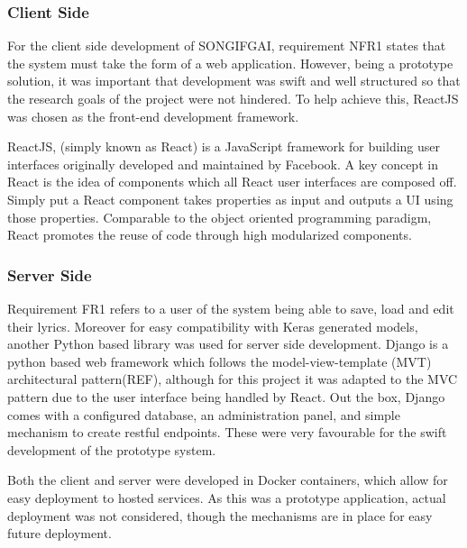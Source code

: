 \subsubsection{Client Side}
For the client side development of SONGIFGAI, requirement NFR1 states that the system must take the form of a web application. However, being a prototype solution, it was important that development was swift and well structured so that the research goals of the project were not hindered. To help achieve this, ReactJS was chosen as the front-end development framework.

\noindent
\newline
ReactJS, (simply known as React) is a JavaScript framework for building user interfaces originally developed and maintained by Facebook. A key concept in React is the idea of components which all React user interfaces are composed off. Simply put a React component takes properties as input and outputs a UI using those properties. Comparable to the object oriented programming paradigm, React promotes the reuse of code through high modularized components.

\subsubsection{Server Side}
Requirement FR1 refers to a user of the system being able to save, load and edit their lyrics. Moreover for easy compatibility with Keras generated models, another Python based library was used for server side development. Django is a python based web framework which follows the model-view-template (MVT) architectural pattern(REF), although for this project it was adapted to the MVC pattern due to the user interface being handled by React. Out the box, Django comes with a configured database, an administration panel, and simple mechanism to create restful endpoints. These were very favourable for the swift development of the prototype system.

\noindent
\newline
Both the client and server were developed in Docker containers, which allow for easy deployment to hosted services. As this was a prototype application, actual deployment was not considered, though the mechanisms are in place for easy future deployment. 